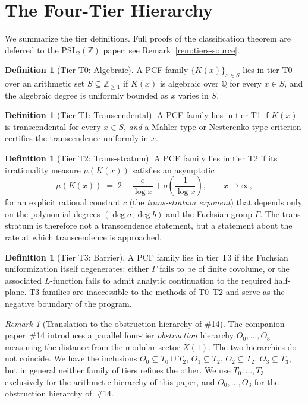 \documentclass[11pt,a4paper]{article}
\theoremstyle{definition}
\newtheorem{definition}[conjecture]{Definition}
\theoremstyle{remark}
\newtheorem{remark}[conjecture]{Remark}
\newcommand{\PSLZ}{\mathrm{PSL}_2(\mathbb{Z})}
\newcommand{\Q}{\mathbb{Q}}
\newcommand{\Z}{\mathbb{Z}}
\begin{document}
\section{The Four-Tier Hierarchy}
\label{sec:tiers}

We summarize the tier definitions. Full proofs of the classification
theorem are deferred to the $\PSLZ$ paper; see Remark~\ref{rem:tiers-source}.

\begin{definition}[Tier T0: Algebraic]
A PCF family $\{K(x)\}_{x \in S}$ lies in tier T0 over an arithmetic set
$S \subseteq \Z_{\geq 1}$ if $K(x)$ is algebraic over $\Q$ for every
$x \in S$, and the algebraic degree is uniformly bounded as $x$ varies in $S$.
\end{definition}

\begin{definition}[Tier T1: Transcendental]
A PCF family lies in tier T1 if $K(x)$ is transcendental for every $x \in S$,
\emph{and} a Mahler-type or Nesterenko-type criterion certifies the
transcendence uniformly in $x$.
\end{definition}

\begin{definition}[Tier T2: Trans-stratum]
A PCF family lies in tier T2 if its irrationality measure $\mu(K(x))$
satisfies an asymptotic
\[
   \mu(K(x)) \;=\; 2 + \frac{c}{\log x} + o\!\left(\frac{1}{\log x}\right),
   \qquad x \to \infty,
\]
for an explicit rational constant $c$ (the \emph{trans-stratum exponent})
that depends only on the polynomial degrees $(\deg a, \deg b)$ and the
Fuchsian group $\Gamma$. The trans-stratum is therefore not a transcendence
statement, but a statement about the rate at which transcendence is
approached.
\end{definition}

\begin{definition}[Tier T3: Barrier]
A PCF family lies in tier T3 if the Fuchsian uniformization itself
degenerates: either $\Gamma$ fails to be of finite covolume, or the
associated $L$-function fails to admit analytic continuation to the
required half-plane. T3 families are inaccessible to the methods of T0--T2
and serve as the negative boundary of the program.
\end{definition}

\begin{remark}[Translation to the obstruction hierarchy of \#14]
\label{rem:tier-translation}
The companion paper~\#14 introduces a parallel four-tier
\emph{obstruction} hierarchy $O_0,\dots,O_3$ measuring the
distance from the modular sector $X(1)$. The two
hierarchies do not coincide. We have the inclusions
$O_0 \subseteq T_0 \cup T_2$, $O_1 \subseteq T_2$,
$O_2 \subseteq T_2$, $O_3 \subseteq T_3$, but in general
neither family of tiers refines the other. We use $T_0,\dots,T_3$
exclusively for the arithmetic hierarchy of this paper, and
$O_0,\dots,O_3$ for the obstruction hierarchy of~\#14.
\end{remark}
\end{document}
